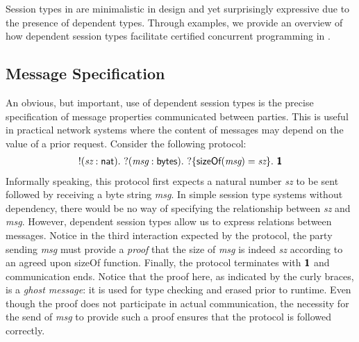 Session types in \TLLC{} are minimalistic in design and yet surprisingly expressive
due to the presence of dependent types. Through examples, we provide an overview of
how dependent session types facilitate certified concurrent programming in \TLLC{}.

\subsection{Message Specification}
An obvious, but important, use of dependent session types is the precise specification
of message properties communicated between parties. This is useful in practical network
systems where the content of messages may depend on the value of a prior request.
Consider the following protocol:
\begin{align*}
  !(\textit{sz}: \textsf{nat}).\
  ?(\textit{msg}: \textsf{bytes}).\ ?\{\textsf{sizeOf}(\textit{msg}) = \textit{sz}\}.\ \textbf{\textsf{1}}
\end{align*}
Informally speaking, this protocol first expects a natural number \textit{sz} to be sent
followed by receiving a byte string \textit{msg}. In simple session type systems without
dependency, there would be no way of specifying the relationship between \textit{sz} and
\textit{msg}. However, dependent session types allow us to express relations between messages.
Notice in the third interaction expected by the protocol, the party sending \textit{msg} must
provide a \emph{proof} that the size of \textit{msg} is indeed \textit{sz} according to
an agreed upon \textsf{sizeOf} function. Finally, the protocol terminates with $\textbf{\textsf{1}}$ and
communication ends. Notice that the proof here, as indicated by the curly braces, is a
\emph{ghost message}: it is used for type checking and erased prior to runtime. Even though
the proof does not participate in actual communication, the necessity for the send of
\textit{msg} to provide such a proof ensures that the protocol is followed correctly.

